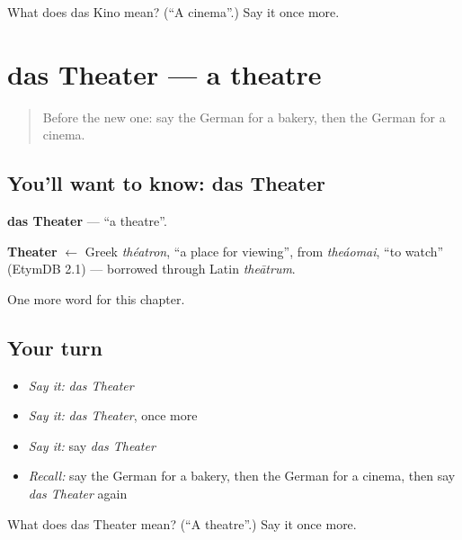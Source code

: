 \begin{tcolorbox}[breakable,colback=teal!4,colframe=teal!35!black,title={Before you move on}]
What does das Kino mean? (\textquotedblleft{}A cinema\textquotedblright{}.) Say it once more.
\end{tcolorbox}
\section[das Theater]{das Theater — a theatre}

\label{lesson:GE-C105-theater}



\begin{quote}
Before the new one: say the German for a bakery, then the German for a cinema.
\end{quote}

\subsection*{You'll want to know: das Theater}
\textbf{das Theater} — \textquotedblleft{}a theatre\textquotedblright{}.

\begin{cousinweb}
\textbf{Theater} $\leftarrow$ Greek \emph{théatron}, \textquotedblleft{}a place for viewing\textquotedblright{}, from \emph{theáomai}, \textquotedblleft{}to watch\textquotedblright{} (EtymDB 2.1) — borrowed through Latin \emph{theātrum}.
\end{cousinweb}

\begin{grammarlens}[title={What you've built}]
One more word for this chapter.
\end{grammarlens}

\subsection*{Your turn}
\begin{itemize}
\raggedright
  \item \emph{Say it:} \emph{das Theater}
  \item \emph{Say it:} \emph{das Theater}, once more
  \item \emph{Say it:} say \emph{das Theater}
  \item \emph{Recall:} say the German for a bakery, then the German for a cinema, then say \emph{das Theater} again
\end{itemize}

\begin{tcolorbox}[breakable,colback=teal!4,colframe=teal!35!black,title={Before you move on}]
What does das Theater mean? (\textquotedblleft{}A theatre\textquotedblright{}.) Say it once more.
\end{tcolorbox}
